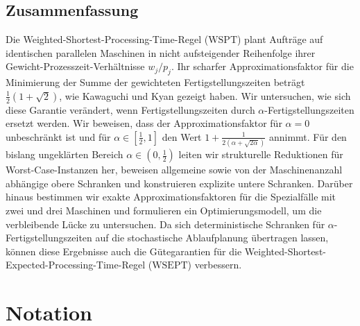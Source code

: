 \documentclass[%
english, titlepage=false %
]{./tum-templates/book/tumbook}
\begin{document}
\section*{Zusammenfassung}
Die Weighted-Shortest-Processing-Time-Regel ($\mathrm{WSPT}$) plant Aufträge auf
identischen parallelen Maschinen in nicht aufsteigender Reihenfolge ihrer
Gewicht-Prozesszeit-Verhältnisse $w_j/p_j$. Ihr scharfer Approximationsfaktor
für die Minimierung der Summe der gewichteten Fertigstellungszeiten beträgt
$\frac{1}{2}(1+\sqrt{2})$, wie Kawaguchi und Kyan \cite{KawaguchiKyan:1988} gezeigt haben.
Wir untersuchen, wie sich diese Garantie verändert, wenn Fertigstellungszeiten
durch $\alpha$-Fertigstellungszeiten ersetzt werden. Wir beweisen, dass
der Approximationsfaktor für $\alpha=0$ unbeschränkt ist und für
$\alpha\in[\frac{1}{2},1]$ den Wert
$1+\frac{1}{2(\alpha+\sqrt{2\alpha})}$ annimmt. Für den bislang ungeklärten Bereich
$\alpha\in(0,\frac{1}{2})$ leiten wir strukturelle Reduktionen für
Worst-Case-Instanzen her, beweisen allgemeine sowie von der Maschinenanzahl abhängige obere
Schranken und konstruieren explizite untere Schranken. Darüber hinaus bestimmen wir
exakte Approximationsfaktoren für die Spezialfälle mit zwei und drei Maschinen und formulieren ein
Optimierungsmodell, um die verbleibende Lücke zu untersuchen. Da sich deterministische
Schranken für $\alpha$-Fertigstellungszeiten auf die stochastische Ablaufplanung übertragen lassen, können diese
Ergebnisse auch die Gütegarantien für die Weighted-Shortest-Expected-Processing-Time-Regel
($\mathrm{WSEPT}$) verbessern.


\cleardoublepage
\tableofcontents

\chapter*{Notation}
\end{document}
